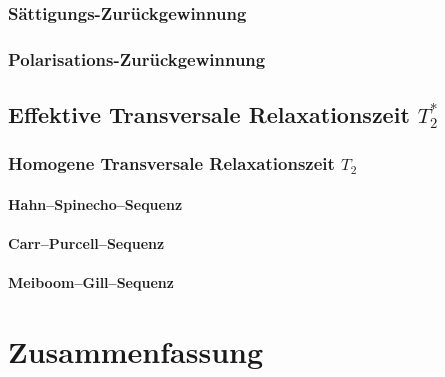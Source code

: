 \subsection{Sättigungs-Zurückgewinnung}
\subsection{Polarisations-Zurückgewinnung}

\section{Effektive Transversale Relaxationszeit $T_2^*$}
\subsection{Homogene Transversale Relaxationszeit $T_2$}
\subsubsection{Hahn–Spinecho–Sequenz}
\subsubsection{Carr–Purcell–Sequenz}
\subsubsection{Meiboom–Gill–Sequenz}



\FloatBarrier
\chapter{Zusammenfassung}

\fehlt


